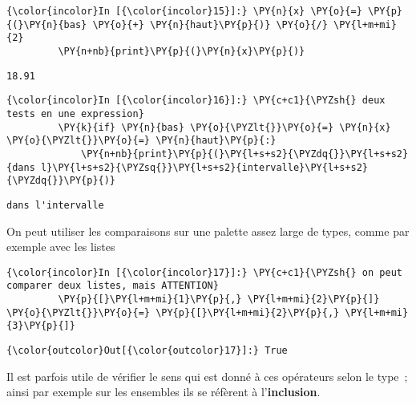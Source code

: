     \begin{Verbatim}[commandchars=\\\{\}]
{\color{incolor}In [{\color{incolor}15}]:} \PY{n}{x} \PY{o}{=} \PY{p}{(}\PY{n}{bas} \PY{o}{+} \PY{n}{haut}\PY{p}{)} \PY{o}{/} \PY{l+m+mi}{2}
         \PY{n+nb}{print}\PY{p}{(}\PY{n}{x}\PY{p}{)}
\end{Verbatim}


    \begin{Verbatim}[commandchars=\\\{\}]
18.91

    \end{Verbatim}

    \begin{Verbatim}[commandchars=\\\{\}]
{\color{incolor}In [{\color{incolor}16}]:} \PY{c+c1}{\PYZsh{} deux tests en une expression}
         \PY{k}{if} \PY{n}{bas} \PY{o}{\PYZlt{}}\PY{o}{=} \PY{n}{x} \PY{o}{\PYZlt{}}\PY{o}{=} \PY{n}{haut}\PY{p}{:}
             \PY{n+nb}{print}\PY{p}{(}\PY{l+s+s2}{\PYZdq{}}\PY{l+s+s2}{dans l}\PY{l+s+s2}{\PYZsq{}}\PY{l+s+s2}{intervalle}\PY{l+s+s2}{\PYZdq{}}\PY{p}{)}
\end{Verbatim}


    \begin{Verbatim}[commandchars=\\\{\}]
dans l'intervalle

    \end{Verbatim}

    On peut utiliser les comparaisons sur une palette assez large de types,
comme par exemple avec les listes

    \begin{Verbatim}[commandchars=\\\{\}]
{\color{incolor}In [{\color{incolor}17}]:} \PY{c+c1}{\PYZsh{} on peut comparer deux listes, mais ATTENTION}
         \PY{p}{[}\PY{l+m+mi}{1}\PY{p}{,} \PY{l+m+mi}{2}\PY{p}{]} \PY{o}{\PYZlt{}}\PY{o}{=} \PY{p}{[}\PY{l+m+mi}{2}\PY{p}{,} \PY{l+m+mi}{3}\PY{p}{]}
\end{Verbatim}


\begin{Verbatim}[commandchars=\\\{\}]
{\color{outcolor}Out[{\color{outcolor}17}]:} True
\end{Verbatim}
            
    Il est parfois utile de vérifier le sens qui est donné à ces opérateurs
selon le type~; ainsi par exemple sur les ensembles ils se réfèrent à
l'\textbf{inclusion}.

